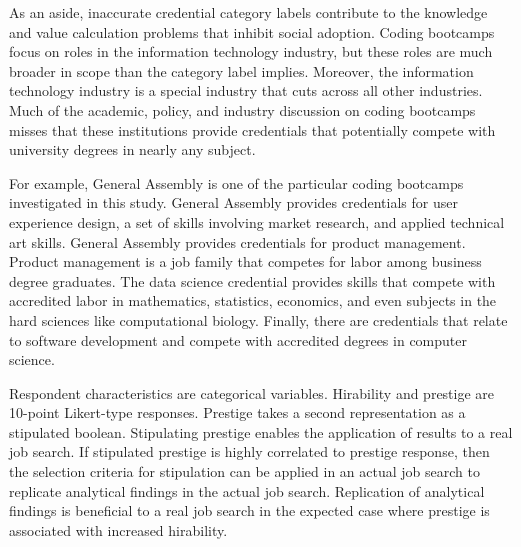 \documentclass[review]{elsarticle}
\begin{document}
As an aside, inaccurate credential category labels contribute to the knowledge and value calculation problems that inhibit social adoption.
Coding bootcamps focus on roles in the information technology industry, but these roles are much broader in scope than the category label implies.
Moreover, the information technology industry is a special industry that cuts across all other industries.
Much of the academic, policy, and industry discussion on coding bootcamps misses that these institutions provide credentials that potentially compete with university degrees in nearly any subject.

For example, General Assembly is one of the particular coding bootcamps investigated in this study.
General Assembly provides credentials for user experience design, a set of skills involving market research, and applied technical art skills.
General Assembly provides credentials for product management.
Product management is a job family that competes for labor among business degree graduates.
The data science credential provides skills that compete with accredited labor in mathematics, statistics, economics, and even subjects in the hard sciences like computational biology.
Finally, there are credentials that relate to software development and compete with accredited degrees in computer science.


Respondent characteristics are categorical variables.
Hirability and prestige are 10-point Likert-type responses.
Prestige takes a second representation as a stipulated boolean.
Stipulating prestige enables the application of results to a real job search.
If stipulated prestige is highly correlated to prestige response,
then the selection criteria for stipulation can be applied in an actual job search to replicate analytical findings in the actual job search.
Replication of analytical findings is beneficial to a real job search in the expected case where prestige is associated with increased hirability.
\end{document}
